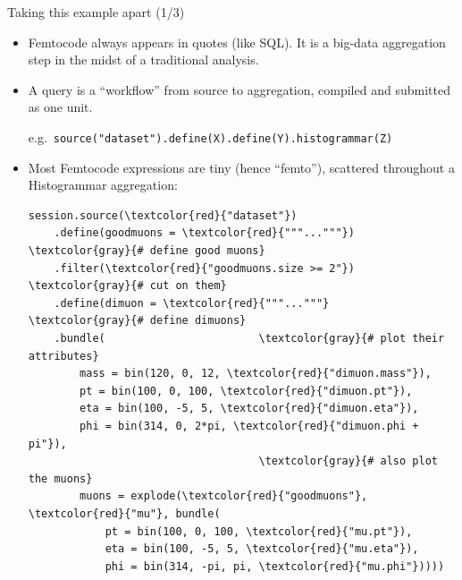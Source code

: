 \documentclass{beamer}
\begin{document}
\begin{frame}[fragile]{Taking this example apart (1/3)}
\vspace{0.25 cm}
\begin{itemize}
\item Femtocode always appears in quotes (like SQL). It is a big-data aggregation step in the midst of a traditional analysis.

\item A query is a ``workflow'' from source to aggregation, compiled and submitted as one unit.

e.g.\ {\tt\scriptsize source("dataset").define(X).define(Y).histogrammar(Z) }

\item Most Femtocode expressions are tiny (hence ``femto''), scattered throughout a Histogrammar aggregation:

\scriptsize
\begin{Verbatim}[commandchars=\\\{\}]
session.source(\textcolor{red}{"dataset"})
    .define(goodmuons = \textcolor{red}{"""..."""})  \textcolor{gray}{# define good muons}
    .filter(\textcolor{red}{"goodmuons.size >= 2"})  \textcolor{gray}{# cut on them}
    .define(dimuon = \textcolor{red}{"""..."""}      \textcolor{gray}{# define dimuons}
    .bundle(                        \textcolor{gray}{# plot their attributes}
        mass = bin(120, 0, 12, \textcolor{red}{"dimuon.mass"}),
        pt = bin(100, 0, 100, \textcolor{red}{"dimuon.pt"}),
        eta = bin(100, -5, 5, \textcolor{red}{"dimuon.eta"}),
        phi = bin(314, 0, 2*pi, \textcolor{red}{"dimuon.phi + pi"}),
                                    \textcolor{gray}{# also plot the muons}
        muons = explode(\textcolor{red}{"goodmuons"}, \textcolor{red}{"mu"}, bundle(
            pt = bin(100, 0, 100, \textcolor{red}{"mu.pt"}),
            eta = bin(100, -5, 5, \textcolor{red}{"mu.eta"}),
            phi = bin(314, -pi, pi, \textcolor{red}{"mu.phi"}))))
\end{Verbatim}
\end{itemize}
\end{frame}
\end{document}
